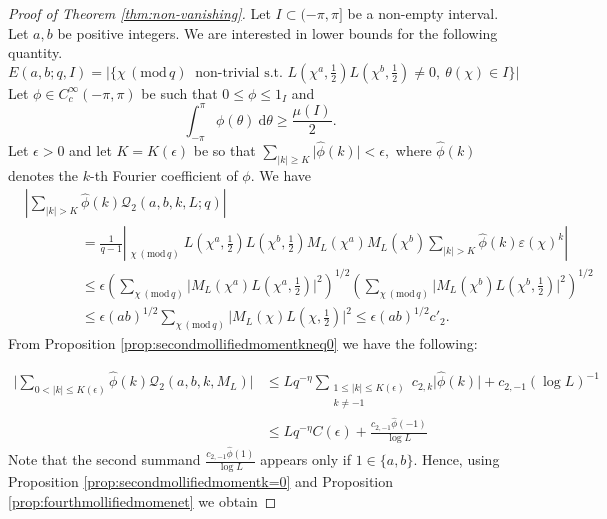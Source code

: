 \documentclass[12pt]{amsart}
\theoremstyle{plain}
\theoremstyle{definition}
\theoremstyle{remark}
\numberwithin{equation}{section}
\newcommand\sumst{\mathop{{\sum}^\ast}\limits}
\newcommand{\mods}[1]{\,(\mathrm{mod}\,{#1})}
\renewcommand{\geq}{\geqslant}
\renewcommand{\leq}{\leqslant}
\begin{document}
\begin{proof}[Proof of Theorem \ref{thm:non-vanishing}] 
    

Let $I \subset (-\pi,\pi]$ be a non-empty interval. Let $a,b$ be positive integers.
We are interested in lower bounds for the following quantity. \[E(a,b;q,I)= \vert{ \{\chi  \mods q\ \text{ non-trivial s.t. }  L(\chi^a,\tfrac 12)L(\chi^b,\tfrac 12)\neq  0,\  \theta(\chi) \in I  \}}\vert\] 
    Let $\phi \in C_c^{\infty}(-\pi,\pi)$ be such that $0\leq \phi\leq 1_I$ and \[\int_{-\pi}^{\pi}\phi(\theta)\ \mathrm{d}\theta \geq \frac{\mu(I)}{2}.\] Let $\epsilon >0$ and let $K = K(\epsilon)$ be so that $\sum_{\vert{k}\vert \geq K}\vert{\widehat{\phi}(k)}\vert < \epsilon,$
    where $\widehat{\phi}(k)$ denotes the $k$-th Fourier coefficient of $\phi$. 
     We have
     \begin{align*}
          &\left\vert{\sum_{\vert{k}\vert >K}\widehat{\phi}(k)\mathcal{Q}_2(a,b,k,L;q)}\right\vert \\&\qquad\qquad= \frac{1}{q-1}\left\vert{\sumst_{\chi \mods{q}}L\left(\chi^a,\tfrac{1}{2}\right)L\left(\chi^b,\tfrac{1}{2}\right)M_L(\chi^a)M_L(\chi^b)\sum_{\vert{k}\vert >K}\widehat{\phi}(k)\varepsilon(\chi)^k}\right\vert\\ &\qquad\qquad\leq \epsilon \left(\sum_{\chi\mods{q}}\vert{M_L(\chi^a)L(\chi^a,\frac{1}{2})}\vert^2\right)^{1/2}\left(\sum_{\chi\mods{q}}\vert{M_L(\chi^b)L(\chi^b,\tfrac{1}{2})}\vert^2\right)^{1/2}\\ &\qquad\qquad\leq \epsilon (ab)^{1/2}\sum_{\chi\mods q}\vert{M_L(\chi)L(\chi,\tfrac{1}{2})}\vert^2\leq \epsilon({ab})^{1/2}c'_2.
    \end{align*}
     From Proposition \ref{prop:secondmollifiedmomentkneq0} we have the following:


     
    \begin{align*}
    \vert{\sum_{0< \vert{k}\vert \leq K(\epsilon)}\widehat{\phi}(k)\mathcal{Q}_2(a,b,k,M_L)}\vert &\leq Lq^{-\eta} \sum_{\substack{1\leq \vert{k}\vert \leq K(\epsilon)\\ k\neq -1}}c_{2,k}\vert{\widehat{\phi}(k)}\vert + c_{2,-1}(\log L)^{-1} \\ &\leq Lq^{-\eta}C(\epsilon) + \frac{c_{2,-1}\widehat{\phi}(-1)}{\log L}   
    \end{align*}
     Note that the second summand $\frac{c_{2,-1}\widehat{\phi}(1)}{\log L}$ appears only if $1\in \{a,b\}$.
    Hence, using Proposition \ref{prop:secondmollifiedmomentk=0} and Proposition \ref{prop:fourthmollifiedmomenet} we obtain  




\end{proof}
\end{document}

